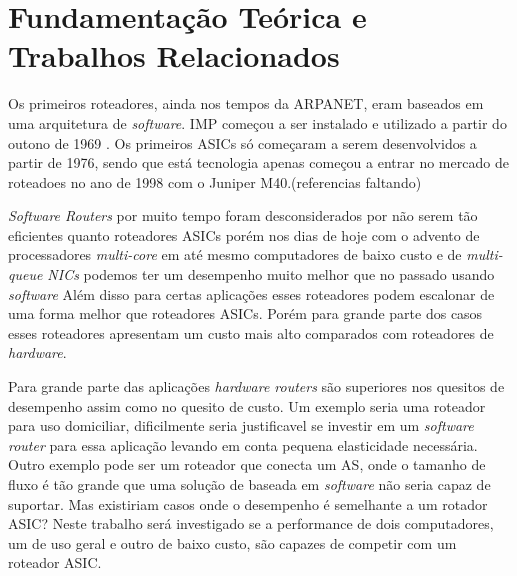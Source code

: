 \section{Fundamentação Teórica e Trabalhos Relacionados}
	Os primeiros roteadores, ainda nos tempos da ARPANET, eram baseados em uma arquitetura de \textit{software}. \ac{IMP} começou a ser instalado e utilizado a partir do outono de 1969 \cite{ARPA}. Os primeiros \acp{ASIC} só começaram a serem desenvolvidos a partir de 1976, sendo que está tecnologia apenas começou a entrar no mercado de roteadoes no ano de 1998 com o Juniper M40.(referencias faltando)

\textit{Software Routers} por muito tempo foram desconsiderados por não serem tão 
eficientes quanto roteadores ASICs porém nos dias de hoje com o advento de processadores
\textit{multi-core} em até mesmo computadores de baixo custo e de \textit{multi-queue NICs}
podemos ter um desempenho muito melhor que no passado usando \textit{software}\cite{linux}
Além disso para certas aplicações esses roteadores podem escalonar de uma forma melhor que roteadores ASICs. Porém para grande parte dos casos esses roteadores apresentam um custo mais alto comparados com roteadores de \textit{hardware}. 

Para grande parte das aplicações \textit{hardware routers} são superiores nos quesitos de desempenho assim como no quesito de custo. Um exemplo seria uma roteador para uso domiciliar, dificilmente seria justificavel se investir em um \textit{software router} para essa aplicação levando em conta pequena elasticidade necessária. Outro exemplo pode ser um roteador que conecta um \ac{AS}, onde o tamanho de fluxo é tão grande que uma solução de baseada em \textit{software} não seria capaz de suportar. Mas existiriam casos onde o desempenho é semelhante a um rotador \ac{ASIC}? Neste trabalho será investigado se a performance de dois computadores, um de uso geral e outro de baixo custo, são capazes de competir com um roteador ASIC.
